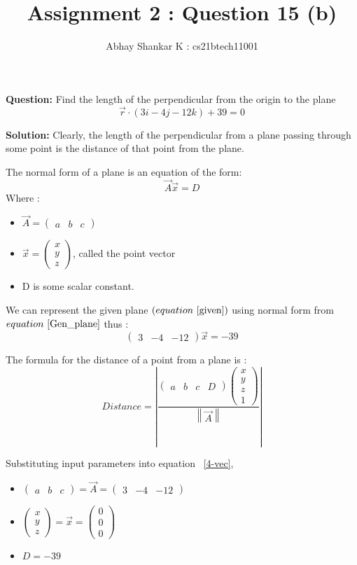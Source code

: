 \documentclass[11pt, oneside, twocolumn, reqno]{article}   	%
\title{Assignment 2 : Question 15 (b)}
\author{Abhay Shankar K : cs21btech11001}
\newcommand{\myvec}[1]{\ensuremath{\begin{pmatrix}#1\end{pmatrix}}}
\providecommand{\norm}[1]{\left\lVert#1\right\rVert}
\providecommand{\abs}[1]{\left\vert#1\right\vert}
\providecommand{\brak}[1]{\ensuremath{\left(#1\right)}}
\newcommand{\question}{\noindent \textbf{Question: }}
\newcommand{\solution}{\noindent \textbf{Solution: }}
\begin{document}
\maketitle

\question
Find the length of the perpendicular from the origin to the plane 
\begin{equation} \label{given}
\vec{r} \cdot \brak{3i - 4j - 12k} + 39 = 0
\end{equation}

\solution
Clearly, the length of the perpendicular from a plane passing through some point is the distance of that point from the plane.

The normal form of a plane is an equation of the form:
\begin{equation}\label{Gen_plane}
\vec{A}\vec{x} = D
\end{equation}
Where :
\begin{itemize}
\item $\vec{A} = \myvec{a & b & c}$
\item $\vec{x} = \myvec{x \\ y \\ z}$, called the point vector
\item D is some scalar constant.
\end{itemize}

We can represent the given plane \brak{equation ~\eqref{given}} using normal form from $equation ~\eqref{Gen_plane}$ thus :
\begin{equation} \label{normal_form}
\myvec{3 & -4 & -12} \vec{x} = -39
\end{equation}

The formula for the distance of a point from a plane is :
\begin{equation} \label{4-vec}
Distance = \abs{\frac{\myvec{a & b & c & D} \myvec{x \\ y \\ z \\ 1}}{\norm{\vec{A}}}}
\end{equation}

Substituting input parameters into equation ~\eqref{4-vec},
\begin{itemize}
\item $\myvec{a & b & c} = \vec{A} = \myvec{3 & -4 & -12}$
\item $\myvec{x \\ y \\ z} = \vec{x} = \myvec{0 \\ 0 \\ 0}$
\item $D = -39$
\end{itemize}
\end{document}
